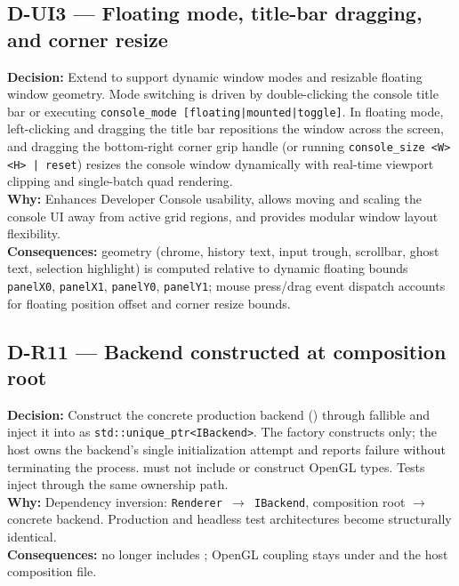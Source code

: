 \subsection*{D-UI3 --- Floating mode, title-bar dragging, and corner resize}
\begin{decisionbox}[title={D-UI3 \quad 2026-08-06}]
\textbf{Decision:} Extend  to support dynamic window modes and resizable floating window geometry. Mode switching is driven by double-clicking the console title bar or executing \texttt{console\_mode [floating|mounted|toggle]}. In floating mode, left-clicking and dragging the title bar repositions the window across the screen, and dragging the bottom-right corner grip handle (or running \texttt{console\_size <W> <H> | reset}) resizes the console window dynamically with real-time viewport clipping and single-batch quad rendering.\\
\textbf{Why:} Enhances Developer Console usability, allows moving and scaling the console UI away from active grid regions, and provides modular window layout flexibility.\\
\textbf{Consequences:}  geometry (chrome, history text, input trough, scrollbar, ghost text, selection highlight) is computed relative to dynamic floating bounds \texttt{panelX0}, \texttt{panelX1}, \texttt{panelY0}, \texttt{panelY1}; mouse press/drag event dispatch accounts for floating position offset and corner resize bounds.
\end{decisionbox}

\subsection*{D-R11 --- Backend constructed at composition root}
\begin{decisionbox}[title={D-R11 \quad 2026-08-06}]
\textbf{Decision:} Construct the concrete production backend
() through fallible  and
inject it into  as \texttt{std::unique\_ptr<IBackend>}.
The factory constructs only; the host owns the backend's single initialization
attempt and reports failure without terminating the process. 
must not include or construct OpenGL types. Tests inject
 through the same ownership path.\\
\textbf{Why:} Dependency inversion: \texttt{Renderer $\rightarrow$ IBackend},
composition root $\rightarrow$ concrete backend. Production and headless test
architectures become structurally identical.\\
\textbf{Consequences:}  no longer includes
; OpenGL coupling stays under
 and the host composition file.
\end{decisionbox}

